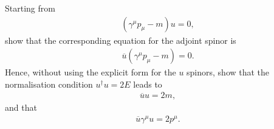 \begin{problem}{4.9}
Starting from
\begin{align*}
    \left( \gamma^\mu p_\mu - m  \right) u = 0,
\end{align*}
show that the corresponding equation for the adjoint spinor is
\begin{align*}
    \overbar{u} \left( \gamma^\mu p_\mu -m \right)=0.
\end{align*} 
Hence, without using the explicit form for the $u$ spinors, show that the normalisation condition $u^\dagger u = 2E$ leads to
\begin{align*}
    \overbar{u}u = 2m,
\end{align*}
and that
\begin{align*}
   \overbar{u} \gamma^\mu u = 2p^\mu.
\end{align*}
\end{problem}
